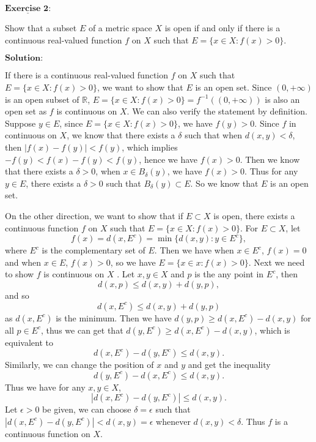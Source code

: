 \documentclass[12pt,a4paper]{ctexart}
\begin{document}
\newpage

$\underline{\textbf{Exercise 2:}}$

Show that a subset $E$ of a metric space $X$ is open if and only if there is a continuous real-valued function $f$ on $X$ such that $E = \{x \in X : f(x) > 0 \}$.
 
\vspace{8pt}
$\textbf{Solution:}$

If there is a continuous real-valued function $f$ on $X$ such that $E = \{x \in X : f(x) > 0 \}$, we want to show that $E$ is an open set. Since $(0, + \infty)$ is an open subset of $\mathbb R$, $E = \{x \in X : f(x) > 0 \} = f^{-1} ((0, + \infty))$ is also an open set as $f$ is continuous on $X$. We can also verify the statement by definition. Suppose $y \in E$, since $E = \{x \in X : f(x) > 0 \}$, we have $f(y) > 0$. Since $f$ in continuous on $X$, we know that there exists a $\delta$ such that when $d(x,y) < \delta$, then $|f(x) - f(y)| < f(y)$, which implies $- f(y) < f(x) - f(y) < f(y)$, hence we have $f(x) > 0$. Then we know that there exists a $\delta > 0$, when $x \in B_{\delta} (y)$, we have $f(x) > 0$. Thus for any $y \in E$, there exists a $\delta > 0$ such that $B_{\delta} (y) \subset E$. So we know that $E$ is an open set.

On the other direction, we want to show that if $E \subset X$ is open, there exists a continuous function $f$ on $X$ such that $E = \{x \in X : f(x) > 0 \}$. For $E \subset X$, let
\begin{equation*}
    f(x) = d(x, E^{c}) = \min \{d(x, y): y \in E^{c} \},
\end{equation*}
where $E^c$ is the complementary set of $E$. Then we have when $x \in E^{c}$, $f(x) = 0$ and when $x \in E$, $f(x) > 0$, so we have $E = \{x \in x : f(x) > 0 \}$. Next we need to show $f$ is continuous on $X$ . Let $x, y \in X$ and $p$ is the any point in $E^{c}$, then
\begin{equation*}
    d(x, p) \leq d(x, y) + d(y, p),
\end{equation*}
and so
\begin{equation*}
    d(x, E^{c}) \leq d(x, y) + d(y, p)
\end{equation*}
as $d(x, E^c)$ is the minimum. Then we have $d(y, p) \geq d(x, E^{c}) - d(x, y)$ for all $p \in E^{c}$, thus we can get that $d(y, E^{c}) \geq d(x, E^{c}) - d(x, y)$, which is equivalent to
\begin{equation*}
    d(x, E^{c}) - d(y, E^{c}) \leq d(x, y).
\end{equation*}
Similarly, we can change the position of $x$ and $y$ and get the inequality
\begin{equation*}
    d(y, E^{c}) - d(x, E^{c}) \leq d(x, y).
\end{equation*}
Thus we have for any $x, y \in X$,
\begin{equation*}
    | d(x, E^{c}) - d(y, E^{c})| \leq d(x, y).
\end{equation*}
Let $\epsilon > 0$ be given, we can choose $\delta = \epsilon$ such that $|d(x, E^{c}) - d(y, E^{c})| < d(x, y) = \epsilon$ whenever $d(x, y) < \delta$. Thus $f$ is a continuous function on $X$.
\end{document}
